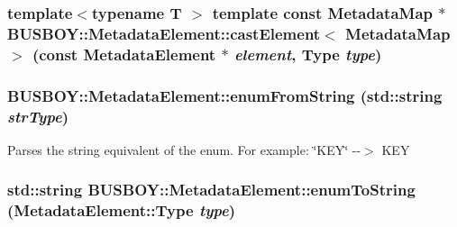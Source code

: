 \label{classBUSBOY_1_1MetadataElement_ac99ac7b0cb21562de6f6b8384e9e1d50}
\hypertarget{classBUSBOY_1_1MetadataElement_adb43074cccd4b5497e8270c52d22d557}{
\subsubsection[{castElement}]{\setlength{\rightskip}{0pt plus 5cm}template$<$typename T $>$ template const {\bf MetadataMap} $\ast$ BUSBOY::MetadataElement::castElement$<$ {\bf MetadataMap} $>$ (const {\bf MetadataElement} $\ast$ {\em element}, \/  {\bf Type} {\em type})}}
\label{classBUSBOY_1_1MetadataElement_adb43074cccd4b5497e8270c52d22d557}
\hypertarget{classBUSBOY_1_1MetadataElement_a433c50e9707c1219f43c203d03b46cd5}{
\subsubsection[{enumFromString}]{ BUSBOY::MetadataElement::enumFromString (std::string {\em strType})}}
\label{classBUSBOY_1_1MetadataElement_a433c50e9707c1219f43c203d03b46cd5}


Parses the string equivalent of the enum. For example: \char`\"{}KEY\char`\"{} -\/-\/$>$ KEY \hypertarget{classBUSBOY_1_1MetadataElement_ab47c6ba17444aad6b1355bbba53280f5}{
\subsubsection[{enumToString}]{\setlength{\rightskip}{0pt plus 5cm}std::string BUSBOY::MetadataElement::enumToString ({\bf MetadataElement::Type} {\em type})}}
\label{classBUSBOY_1_1MetadataElement_ab47c6ba17444aad6b1355bbba53280f5}


